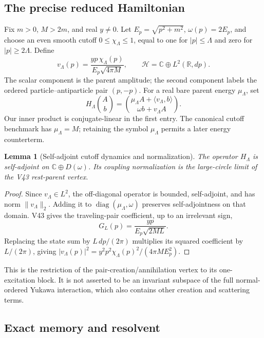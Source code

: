 \documentclass[11pt]{article}
\newtheorem{lemma}[theorem]{Lemma}
\theoremstyle{remark}
\begin{document}
\subsection{The precise reduced Hamiltonian}

Fix \(m>0\), \(M>2m\), and real \(y\neq0\).  Let
\(E_p=\sqrt{p^2+m^2}\), \(\omega(p)=2E_p\), and choose an even smooth
cutoff \(0\leq\chi_\Lambda\leq1\), equal to one for \(|p|\leq\Lambda\)
and zero for \(|p|\geq2\Lambda\).  Define
\[
 v_\Lambda(p)=
 \frac{yp\,\chi_\Lambda(p)}{E_p\sqrt{4\pi M}},\qquad
 \mathcal H=\mathbb C\oplus L^2(\mathbb R,dp).
\]
The scalar component is the parent amplitude; the second component
labels the ordered particle--antiparticle pair \((p,-p)\).
For a real bare parent energy \(\mu_\Lambda\), set
\[
 H_\Lambda\binom{A}{b}=
 \binom{\mu_\Lambda A+\langle v_\Lambda,b\rangle}
       {\omega b+v_\Lambda A}.
\]
Our inner product is conjugate-linear in the first entry.
The canonical cutoff benchmark has \(\mu_\Lambda=M\); retaining the
symbol \(\mu_\Lambda\) permits a later energy counterterm.

\begin{lemma}[Self-adjoint cutoff dynamics and normalization]
\label{lem:v20v46-H}
The operator \(H_\Lambda\) is self-adjoint on
\(\mathbb C\oplus D(\omega)\).  Its coupling normalization is the
large-circle limit of the V43 rest-parent vertex.
\end{lemma}
\begin{proof}
Since \(v_\Lambda\in L^2\), the off-diagonal operator is bounded,
self-adjoint, and has norm \(\|v_\Lambda\|_2\).
Adding it to \(\operatorname{diag}(\mu_\Lambda,\omega)\) preserves
self-adjointness on that domain.
V43 gives the traveling-pair coefficient, up to an irrelevant sign,
\[
 G_L(p)=\frac{yp}{E_p\sqrt{2ML}}.
\]
Replacing the state sum by \(L\,dp/(2\pi)\) multiplies its squared
coefficient by \(L/(2\pi)\), giving
\(|v_\Lambda(p)|^2=y^2p^2\chi_\Lambda(p)^2/(4\pi M E_p^2)\).
\end{proof}

This is the restriction of the pair-creation/annihilation vertex
to its one-excitation block.  It is not asserted to be an invariant
subspace of the full normal-ordered Yukawa interaction, which also
contains other creation and scattering terms.

\subsection{Exact memory and resolvent}
\end{document}
